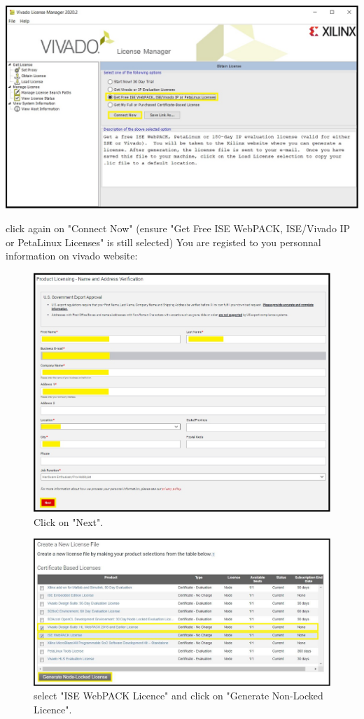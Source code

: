 \includegraphics[width=\linewidth]{images/VivadoInstimg023.jpg}

click again on "Connect Now" (ensure "Get Free ISE WebPACK, ISE/Vivado IP or PetaLinux Licenses" is still selected)
You are registed to you personnal information on vivado website:

\begin{figure}[H]
\centering
  \includegraphics[width=0.8\linewidth]{images/VivadoInstimg025.jpg}
  \captionsetup{width=0.8\linewidth}
  \caption{Click on "Next".}
  \label{fig:VivadoInstimg025}
\end{figure}

\begin{figure}[H]
\centering
  \includegraphics[width=0.8\linewidth]{images/VivadoInstimg026.jpg}
  \captionsetup{width=0.8\linewidth}
  \caption{select "ISE WebPACK Licence" and click on "Generate Non-Locked Licence".}
  \label{fig:VivadoInstimg026}
\end{figure}

